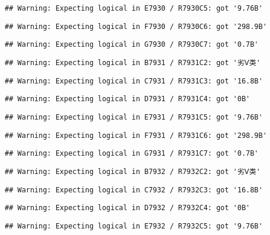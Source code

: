 \documentclass[
]{article}
\begin{document}
\begin{verbatim}
## Warning: Expecting logical in E7930 / R7930C5: got '9.76B'
\end{verbatim}

\begin{verbatim}
## Warning: Expecting logical in F7930 / R7930C6: got '298.9B'
\end{verbatim}

\begin{verbatim}
## Warning: Expecting logical in G7930 / R7930C7: got '0.7B'
\end{verbatim}

\begin{verbatim}
## Warning: Expecting logical in B7931 / R7931C2: got '劣Ⅴ类'
\end{verbatim}

\begin{verbatim}
## Warning: Expecting logical in C7931 / R7931C3: got '16.8B'
\end{verbatim}

\begin{verbatim}
## Warning: Expecting logical in D7931 / R7931C4: got '0B'
\end{verbatim}

\begin{verbatim}
## Warning: Expecting logical in E7931 / R7931C5: got '9.76B'
\end{verbatim}

\begin{verbatim}
## Warning: Expecting logical in F7931 / R7931C6: got '298.9B'
\end{verbatim}

\begin{verbatim}
## Warning: Expecting logical in G7931 / R7931C7: got '0.7B'
\end{verbatim}

\begin{verbatim}
## Warning: Expecting logical in B7932 / R7932C2: got '劣Ⅴ类'
\end{verbatim}

\begin{verbatim}
## Warning: Expecting logical in C7932 / R7932C3: got '16.8B'
\end{verbatim}

\begin{verbatim}
## Warning: Expecting logical in D7932 / R7932C4: got '0B'
\end{verbatim}

\begin{verbatim}
## Warning: Expecting logical in E7932 / R7932C5: got '9.76B'
\end{verbatim}
\end{document}
